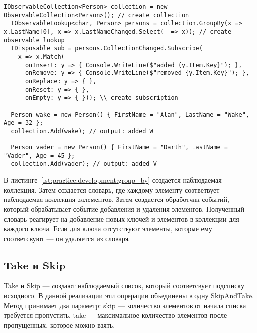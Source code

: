 \begin{lstlisting}[style=csharpinlinestyle, caption={Пример использования GroupBy}, label=lst:practice:development:group_by]
  IObservableCollection<Person> collection = new ObservableCollection<Person>(); // create collection
  IObservableLookup<char, Person> persons = collection.GroupBy(x => x.LastName[0], x => x.LastNameChanged.Select(_ => x)); // create observable lookup
  IDisposable sub = persons.CollectionChanged.Subscribe(
    x => x.Match(
      onInsert: y => { Console.WriteLine($"added {y.Item.Key}"); },
      onRemove: y => { Console.WriteLine($"removed {y.Item.Key}"); },
      onReplace: y => { },
      onReset: y => { },
      onEmpty: y => { })); \\ create subscription

  Person wake = new Person() { FirstName = "Alan", LastName = "Wake", Age = 32 };
  collection.Add(wake); // output: added W

  Person vader = new Person() { FirstName = "Darth", LastName = "Vader", Age = 45 };
  collection.Add(vader); // output: added V

\end{lstlisting}

В листинге~\ref{lst:practice:development:group_by} создается наблюдаемая коллекция. Затем создается словарь, где каждому элементу соответвует наблюдаемая коллекция эллементов.
Затем создается обработчик событий, который обрабатывает событие добавления и удаления элементов.
Полученный словарь реагирует на добавление новых ключей и элементов в коллекции для каждого ключа. Если для ключа отсутствуют элементы, которые ему соответсвуют --- он удаляется из словаря.

\subsection{Take и Skip}
\label{sub:development:take_skip}

Take и Skip --- cоздают наблюдаемый список, который соответсвует подсписку исходного. В данной реализации эти опрерации объединены в одну SkipAndTake.
Метод принимает два параметр: skip --- количество элементов от начала списка требуется пропустить, take --- максимальное количество элементов после пропущенных, которое можно взять.

